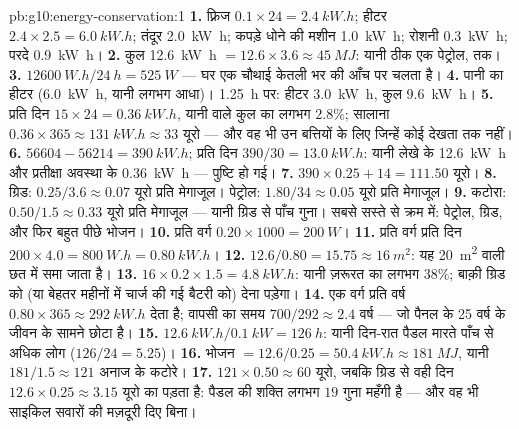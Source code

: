 \begin{solution}{pb:g10:energy-conservation:1}
\textbf{1.} फ़्रिज $0.1 \times 24 = \qty{2.4}{kW.h}$; हीटर $2.4 \times 2.5 = \qty{6.0}{kW.h}$; तंदूर \qty{2.0}{kW.h}; कपड़े धोने की मशीन
\qty{1.0}{kW.h}; रोशनी \qty{0.3}{kW.h}; परदे \qty{0.9}{kW.h}।
\textbf{2.} कुल \qty{12.6}{kW.h} $= 12.6 \times 3.6 \approx
\qty{45}{MJ}$: यानी ठीक एक  पेट्रोल,
 तक।
\textbf{3.} $\qty{12600}{W.h}/\qty{24}{h} = \qty{525}{W}$ --- घर एक चौथाई केतली भर की आँच पर चलता है।
\textbf{4.} पानी का हीटर (\qty{6.0}{kW.h}, यानी लगभग आधा)। \qty{1.25}{h} पर: हीटर
\qty{3.0}{kW.h}, कुल \qty{9.6}{kW.h}।
\textbf{5.} प्रति दिन $15 \times 24 = \qty{0.36}{kW.h}$, यानी  वाले कुल का लगभग $2.8\%$;
सालाना $0.36 \times 365 \approx
\qty{131}{kW.h} \approx 33$ यूरो --- और वह भी उन बत्तियों के लिए जिन्हें कोई देखता
तक नहीं।
\textbf{6.} $56604 - 56214 = \qty{390}{kW.h}$; प्रति दिन $390/30 = \qty{13.0}{kW.h}$: यानी लेखे के \qty{12.6}{kW.h} और प्रतीक्षा
अवस्था के \qty{0.36}{kW.h} --- पुष्टि हो गई।
\textbf{7.} $390 \times 0.25 + 14 = 111.50$ यूरो।
\textbf{8.} ग्रिड: $0.25/3.6 \approx 0.07$ यूरो प्रति मेगाजूल। पेट्रोल: $1.80/34 \approx 0.05$ यूरो
प्रति मेगाजूल।
\textbf{9.} कटोरा: $0.50/1.5 \approx 0.33$ यूरो प्रति मेगाजूल --- यानी ग्रिड से पाँच
गुना। सबसे सस्ते से क्रम में: पेट्रोल, ग्रिड, और फिर बहुत पीछे भोजन।
\textbf{10.} प्रति वर्ग  $0.20 \times 1000 = \qty{200}{W}$।
\textbf{11.} प्रति वर्ग  प्रति दिन $200 \times 4.0 = \qty{800}{W.h} = \qty{0.80}{kW.h}$।
\textbf{12.} $12.6/0.80 = 15.75 \approx \qty{16}{m^2}$: यह \qty{20}{m^2} वाली छत में समा जाता है।
\textbf{13.} $16 \times 0.2 \times 1.5 = \qty{4.8}{kW.h}$: यानी ज़रूरत का लगभग $38\%$; बाक़ी ग्रिड को (या
बेहतर महीनों में चार्ज की गई बैटरी को) देना पड़ेगा।
\textbf{14.} एक वर्ग  प्रति वर्ष $0.80 \times 365 \approx
\qty{292}{kW.h}$ देता है; वापसी का
समय $700/292 \approx 2.4$ वर्ष --- जो पैनल के 25 वर्ष के जीवन के सामने छोटा है।
\textbf{15.} $\qty{12.6}{kW.h}/\qty{0.1}{kW} = \qty{126}{h}$: यानी दिन-रात पैडल मारते पाँच से अधिक लोग
($126/24 = 5.25$)।
\textbf{16.} भोजन $= 12.6/0.25 = \qty{50.4}{kW.h} \approx
\qty{181}{MJ}$, यानी $181/1.5 \approx 121$ अनाज के कटोरे।
\textbf{17.} $121 \times 0.50 \approx 60$ यूरो, जबकि ग्रिड से वही दिन $12.6 \times 0.25 \approx 3.15$ यूरो का पड़ता
है: पैडल की शक्ति लगभग $19$ गुना महँगी है --- और वह भी
साइकिल सवारों की मज़दूरी दिए बिना।

\end{solution}

